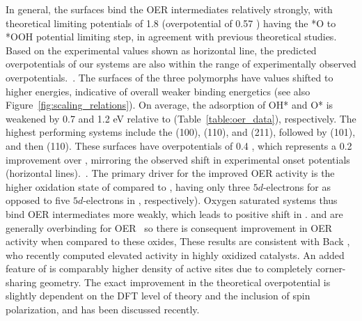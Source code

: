 In general, the \rIrOtwo surfaces bind the OER intermediates relatively strongly, with theoretical limiting potentials of \mytilde\num{1.8} \VRHE (overpotential of \num{0.57} \VRHE) having the  *O to *OOH potential limiting step, in agreement with previous theoretical studies.~\cite{Briquet2017,Strickler2019,raman_surface_2020} 
Based on the experimental values shown as horizontal line, the predicted overpotentials of our \rIrOtwo systems are also within the range of experimentally observed overpotentials.~\cite{Seitz2016, Kuo2017}.
The surfaces of the three \IrOthree polymorphs have \DGOmOH values shifted to higher energies, indicative of overall weaker binding energetics (see also Figure~\ref{fig:scaling_relations}).
On average, the adsorption of OH* and O* is weakened by 0.7 and 1.2 eV relative to \IrOtwo (Table~\ref{table:oer_data}), respectively.
The highest performing systems include the \aIrOthree (100), (110), and (211), followed by \bIrOthree (101), and then \rIrOthree (110).
%
These surfaces have overpotentials of \mytilde\num{0.4} \VRHE,
which represents a \mytilde\num{0.2} \VRHE improvement over \rIrOtwo, mirroring the observed shift in experimental onset potentials (horizontal lines).~\cite{Seitz2016, Kuo2017}.
The primary driver for the improved OER activity is the higher oxidation state of \IrOthree compared to \IrOtwo, having only three $5d$-electrons for  as opposed to five $5d$-electrons in  , respectively). Oxygen saturated \IrOthree systems thus bind OER intermediates more weakly, which leads to positive shift in \DGOmOH. \IrOtwo and \RhOtwo are generally overbinding for OER~\cite{Dickens2019} so there is consequent improvement in OER activity when compared to these oxides, 
These results are consistent with Back , who recently computed elevated activity in highly oxidized \IrOthree catalysts.\cite{Back2019} An added feature of \aIrOthree is comparably higher density of active sites due to completely corner-sharing geometry. 
The exact improvement in the theoretical overpotential is slightly dependent on the DFT level of theory and the inclusion of spin polarization, and has been discussed recently.~\cite{Seitz2016,Strickler2019}
